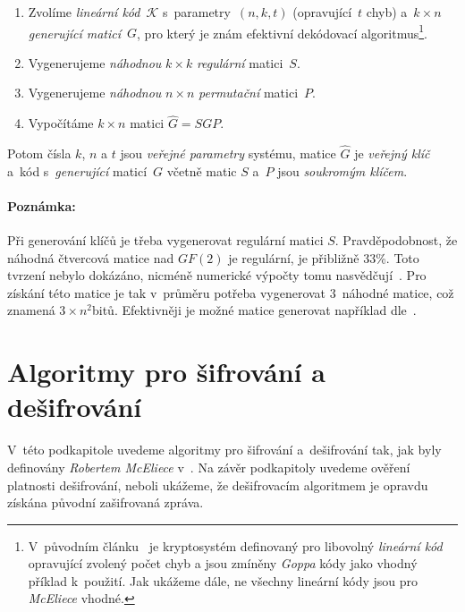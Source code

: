 \documentclass[thesis=M,czech,hidelinks]{FITthesis}[2012/06/26]
\newcommand{\0}{{\textcolor[gray]{0.75}{0}}}
\begin{document}
\begin{enumerate}
    \item Zvolíme \emph{lineární kód}~$\mathcal{K}$ s~parametry~$(n,k,t)$
        (opravující~$t$ chyb) a~$k \times n$ \emph{generující maticí}~$G$,
        pro který je znám efektivní dekódovací algoritmus\footnote{
            V~původním článku~\cite{McEliece} je kryptosystém definovaný pro
            libovolný \emph{lineární kód} opravující zvolený počet chyb a jsou
            zmíněny \emph{Goppa} kódy jako vhodný příklad k~použití. Jak ukážeme
            dále, ne všechny lineární kódy jsou pro \emph{McEliece} vhodné.
        }.
    \item Vygenerujeme \emph{náhodnou} $k \times k$ \emph{regulární} matici~$S$.
    \item Vygenerujeme \emph{náhodnou} $n \times n$ \emph{permutační} matici~$P$.
    \item Vypočítáme $k \times n$ matici $\hat{G} = S G P$.
\end{enumerate}

Potom čísla $k$, $n$ a $t$ jsou \emph{veřejné parametry} systému, matice
$\hat{G}$ je \emph{veřejný klíč} a~kód s~\emph{generující} maticí~$G$ včetně
matic $S$ a~$P$ jsou \emph{soukromým klíčem}.


\paragraph{Poznámka:} Při generování klíčů je třeba vygenerovat regulární matici
$S$. Pravděpodobnost, že náhodná čtvercová matice nad $GF(2)$ je regulární, je
přibližně $33$\;\%.  Toto tvrzení nebylo dokázáno, nicméně numerické výpočty
tomu nasvědčují~\cite{Heyse}. Pro získání této matice je tak v~průměru potřeba
vygenerovat $3$~náhodné matice, což znamená $3\times n^2$\;bitů. Efektivněji je
možné matice generovat například dle~\cite{Randall}.



\section{Algoritmy pro šifrování a dešifrování}\label{kap_mceliece_algoritmy}

V~této podkapitole uvedeme algoritmy pro šifrování a~dešifrování tak, jak byly
definovány \emph{Robertem McEliece} v~\cite{McEliece}. Na závěr podkapitoly
uvedeme ověření platnosti dešifrování, neboli ukážeme, že dešifrovacím
algoritmem je opravdu získána původní zašifrovaná zpráva.
\end{document}

